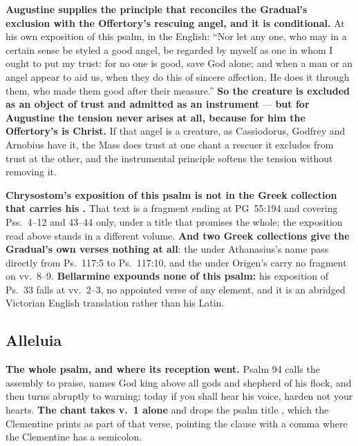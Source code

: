 \textbf{Augustine supplies the principle that reconciles the Gradual's exclusion
with the Offertory's rescuing angel, and it is conditional.} At his own
exposition of this psalm, in the  English:
``Nor let any one, who may in a certain sense be styled a good angel, be
regarded by myself as one in whom I ought to put my trust: for no one is good,
save God alone; and when a man or an angel appear to aid us, when they do this
of sincere affection, He does it through them, who made them good after their
measure.'' \textbf{So the creature is excluded as an object of trust and
admitted as an instrument} --- \textbf{but for Augustine the tension never arises
at all, because for him the Offertory's  is Christ.} If that
angel is a creature, as Cassiodorus, Godfrey and Arnobius have it, the Mass does
trust at one chant a rescuer it excludes from trust at the other, and the
instrumental principle softens the tension without removing it.

\textbf{Chrysostom's exposition of this psalm is not in the Greek collection
that carries his .} That
text is a fragment ending at PG~55:194
and covering Pss.~4--12 and 43--44 only, under a title that promises the whole;
the exposition read above stands in a different volume.
\textbf{And two Greek collections give the Gradual's own verses nothing at all}:
the  under Athanasius's name pass directly from Ps.~117:5 to
Ps.~117:10, and the  under Origen's carry no fragment on
vv.~8--9. \textbf{Bellarmine expounds none of this psalm:} his exposition of Ps.~33 falls
at vv.~2--3, no appointed verse of any element, and it is
an abridged Victorian English translation rather than his Latin.

\elementguard
\subsection*{Alleluia }


\textbf{The whole psalm, and where its reception went.} Psalm 94 calls the
assembly to praise, names God king above all gods and shepherd of his flock, and
then turns abruptly to warning: today if you shall hear his voice, harden not
your hearts. \textbf{The chant takes v.~1 alone} and drops the psalm title
, which the Clementine prints as part of that
verse, pointing the clause with a comma where the Clementine has a semicolon.

